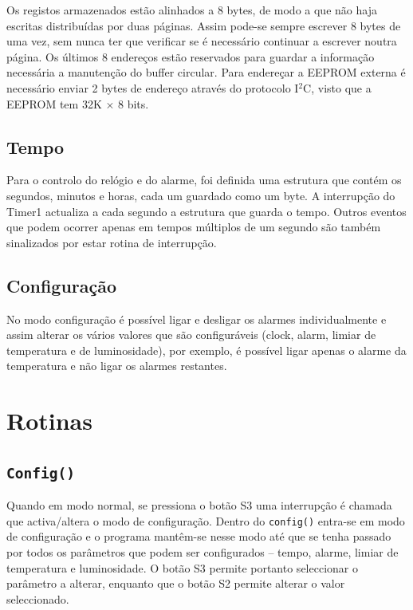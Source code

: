 \documentclass[a4paper,12pt]{article}
\begin{document}
Os registos armazenados estão alinhados a 8 bytes, de modo a que não haja escritas distribuídas por duas páginas. Assim pode-se sempre escrever 8 bytes de uma vez, sem nunca ter que verificar se é necessário continuar a escrever noutra página. Os últimos 8 endereços estão reservados para guardar a informação necessária a manutenção do buffer circular. Para endereçar a EEPROM externa é necessário enviar 2 bytes de endereço através do protocolo I$^2$C, visto que a EEPROM tem 32K $\times$ 8 bits.

\subsection{Tempo}

Para o controlo do relógio e do alarme, foi definida uma estrutura que contém os segundos, minutos e horas, cada um guardado como um byte. A interrupção do Timer1 actualiza a cada segundo a estrutura que guarda o tempo. Outros eventos que podem ocorrer apenas em tempos múltiplos de um segundo são também sinalizados por estar rotina de interrupção.

\subsection{Configuração}

No modo configuração é possível ligar e desligar os alarmes individualmente e assim alterar os vários valores que são configuráveis (clock, alarm, limiar de temperatura e de luminosidade), por exemplo, é possível ligar apenas o alarme da temperatura e não ligar os alarmes restantes.


\section{Rotinas}

\subsection{\texttt{Config()}}

Quando em modo normal, se pressiona o botão S3 uma interrupção é chamada que activa/altera o modo de configuração. Dentro do \texttt{config()} entra-se em modo de configuração e o programa mantêm-se nesse modo até que se tenha passado por todos os parâmetros que podem ser configurados -- tempo, alarme, limiar de temperatura e luminosidade. O botão S3 permite portanto seleccionar o parâmetro a alterar, enquanto que o botão S2 permite alterar o valor seleccionado.
\end{document}
